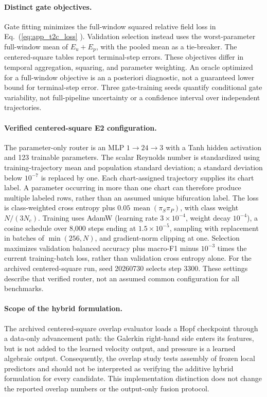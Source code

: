 \documentclass{article}
\def\plaineqref#1{\ref{#1}}
\providecommand{\DIFaddtex}[1]{{\protect\color{blue} \sf #1}} %
\providecommand{\DIFadd}[1]{\texorpdfstring{\DIFaddtex{#1}}{#1}} %
\begin{document}
\paragraph{\DIFadd{Distinct gate objectives.}}
\DIFadd{Gate fitting minimizes the full-window squared relative field loss in Eq.~(}\plaineqref{eq:app_t2c_loss}\DIFadd{). Validation selection instead uses the worst-parameter full-window mean of $E_u+E_p$, with the pooled mean as a tie-breaker. The centered-square tables report terminal-step errors. These objectives differ in temporal aggregation, squaring, and parameter weighting. An oracle optimized for a full-window objective is an a posteriori diagnostic, not a guaranteed lower bound for terminal-step error. Three gate-training seeds quantify conditional gate variability, not full-pipeline uncertainty or a confidence interval over independent trajectories.
}

\paragraph{\DIFadd{Verified centered-square E2 configuration.}}
\DIFadd{The parameter-only router is an MLP $1\to24\to3$ with a Tanh hidden activation and 123 trainable parameters. The scalar Reynolds number is standardized using training-trajectory mean and population standard deviation; a standard deviation below $10^{-7}$ is replaced by one. Each chart-assigned trajectory supplies its chart label. A parameter occurring in more than one chart can therefore produce multiple labeled rows, rather than an assumed unique bifurcation label. The loss is class-weighted cross entropy plus $0.05\,\operatorname{mean}(\pi_S\pi_P)$, with class weight $N/(3N_c)$. Training uses AdamW (learning rate $3\times10^{-4}$, weight decay $10^{-4}$), a cosine schedule over 8,000 steps ending at $1.5\times10^{-5}$, sampling with replacement in batches of $\min(256,N)$, and gradient-norm clipping at one. Selection maximizes validation balanced accuracy plus macro-F1 minus $10^{-3}$ times the current training-batch loss, rather than validation cross entropy alone. For the archived centered-square run, seed 20260730 selects step 3300. These settings describe that verified router, not an assumed common configuration for all benchmarks.
}

\paragraph{\DIFadd{Scope of the hybrid formulation.}}
\DIFadd{The archived centered-square overlap evaluator loads a Hopf checkpoint through a data-only advancement path: the Galerkin right-hand side enters its features, but is not added to the learned velocity output, and pressure is a learned algebraic output. Consequently, the overlap study tests assembly of frozen local predictors and should not be interpreted as verifying the additive hybrid formulation for every candidate. This implementation distinction does not change the reported overlap numbers or the output-only fusion protocol.
}
\end{document}
